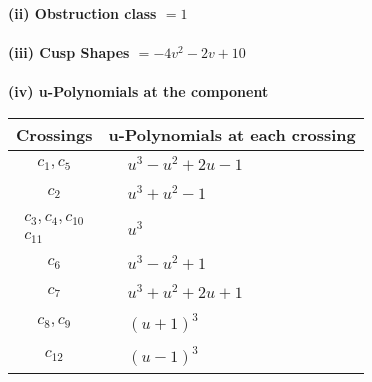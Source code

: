 \documentclass[1p]{elsarticle_modified}
\theoremstyle{definition}
\begin{document}
\flushleft \textbf{(ii) Obstruction class $= 1$}\\~\\
\flushleft \textbf{(iii) Cusp Shapes $= -4 v^2-2 v+10$}\\~\\
\newpage\renewcommand{\arraystretch}{1}
\flushleft \textbf{(iv) u-Polynomials at the component}\newline \\
\begin{tabular}{m{50pt}|m{274pt}}
Crossings & \hspace{64pt}u-Polynomials at each crossing \\
\hline $$\begin{aligned}c_{1},c_{5}\end{aligned}$$&$\begin{aligned}
&u^3- u^2+2 u-1
\end{aligned}$\\
\hline $$\begin{aligned}c_{2}\end{aligned}$$&$\begin{aligned}
&u^3+u^2-1
\end{aligned}$\\
\hline $$\begin{aligned}c_{3},c_{4},c_{10}\\c_{11}\end{aligned}$$&$\begin{aligned}
&u^3
\end{aligned}$\\
\hline $$\begin{aligned}c_{6}\end{aligned}$$&$\begin{aligned}
&u^3- u^2+1
\end{aligned}$\\
\hline $$\begin{aligned}c_{7}\end{aligned}$$&$\begin{aligned}
&u^3+u^2+2 u+1
\end{aligned}$\\
\hline $$\begin{aligned}c_{8},c_{9}\end{aligned}$$&$\begin{aligned}
&(u+1)^3
\end{aligned}$\\
\hline $$\begin{aligned}c_{12}\end{aligned}$$&$\begin{aligned}
&(u-1)^3
\end{aligned}$\\
\hline
\end{tabular}\\~\\
\end{document}
